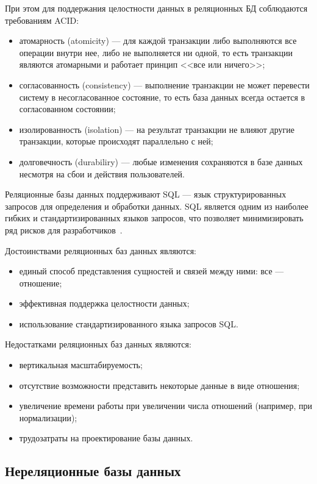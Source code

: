 При этом для поддержания целостности данных в реляционных БД соблюдаются
требованиям ACID:
\begin{itemize}
    \item атомарность (atomicity) --- для каждой транзакции либо выполняются все
        операции внутри нее, либо не выполняется ни одной, то есть
        транзакции являются атомарными и работает принцип <<все или ничего>>;
    \item согласованность (consistency) --- выполнение транзакции не может
        перевести систему в несогласованное состояние, то есть база данных
        всегда остается в согласованном состоянии;
    \item изолированность (isolation) --- на результат транзакции не влияют
        другие транзакции, которые происходят параллельно с ней;
    \item долговечность (durabiliry) --- любые изменения сохраняются в базе
        данных несмотря на сбои и действия пользователей.
\end{itemize}

Реляционные базы данных поддерживают SQL --- язык структурированных запросов для
определения и обработки данных. SQL является одним из наиболее гибких и
стандартизированных языков запросов, что позволяет минимизировать ряд рисков
для разработчиков~\cite{art04}.

Достоинствами реляционных баз данных являются:
\begin{itemize}
    \item единый способ представления сущностей и связей между ними:
        все --- отношение;
    \item эффективная поддержка целостности данных;
    \item использование стандартизированного языка запросов SQL.
\end{itemize}

Недостатками реляционных баз данных являются:
\begin{itemize}
    \item вертикальная масштабируемость;
    \item отсутствие возможности представить некоторые данные в виде отношения;
    \item увеличение времени работы при увеличении числа отношений (например,
        при нормализации);
    \item трудозатраты на проектирование базы данных.
\end{itemize}

\subsection{Нереляционные базы данных}

